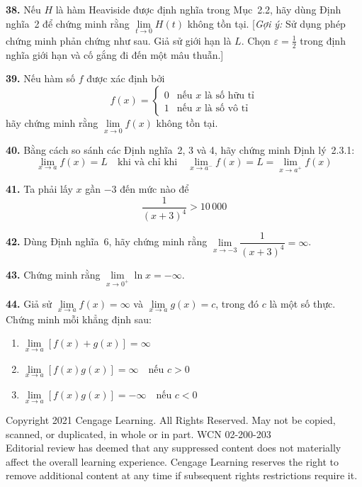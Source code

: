 \begin{minipage}[t]{0.48\textwidth}
\vspace{3pt}
\textbf{38.} Nếu $H$ là hàm Heaviside được định nghĩa trong Mục~2.2, hãy dùng Định nghĩa~2 để chứng minh rằng $\lim\limits_{t \to 0} H(t)$ không tồn tại. [\textit{Gợi ý:} Sử dụng phép chứng minh phản chứng như sau. Giả sử giới hạn là $L$. Chọn $\varepsilon = \frac{1}{2}$ trong định nghĩa giới hạn và cố gắng đi đến một mâu thuẫn.]

\vspace{3pt}
\textbf{39.} Nếu hàm số $f$ được xác định bởi
\[ f(x) = \begin{cases} 0 & \text{nếu } x \text{ là số hữu tỉ} \\ 1 & \text{nếu } x \text{ là số vô tỉ} \end{cases} \]
hãy chứng minh rằng $\lim\limits_{x \to 0} f(x)$ không tồn tại.

\vspace{2pt}
\textbf{40.} Bằng cách so sánh các Định nghĩa~2, 3 và 4, hãy chứng minh Định lý~2.3.1:
\[ \lim_{x \to a} f(x) = L \quad\text{khi và chỉ khi}\quad \lim_{x \to a^-} f(x) = L = \lim_{x \to a^+} f(x) \]

\textbf{41.} Ta phải lấy $x$ gần $-3$ đến mức nào để
\[ \frac{1}{(x + 3)^4} > 10\,000 \]

\textbf{42.} Dùng Định nghĩa~6, hãy chứng minh rằng $\lim\limits_{x \to -3} \dfrac{1}{(x + 3)^4} = \infty$.

\vspace{2pt}
\textbf{43.} Chứng minh rằng $\lim\limits_{x \to 0^+} \ln x = -\infty$.

\vspace{2pt}
\textbf{44.} Giả sử $\lim\limits_{x \to a} f(x) = \infty$ và $\lim\limits_{x \to a} g(x) = c$, trong đó $c$ là một số thực. Chứng minh mỗi khẳng định sau:
\begin{enumerate}[label=\textbf{(\alph*)}, leftmargin=1.5em, topsep=1pt, itemsep=0.5pt, parsep=0pt]
  \item $\lim\limits_{x \to a} [f(x) + g(x)] = \infty$
  \item $\lim\limits_{x \to a} [f(x)g(x)] = \infty \quad\text{nếu } c > 0$
  \item $\lim\limits_{x \to a} [f(x)g(x)] = -\infty \quad\text{nếu } c < 0$
\end{enumerate}

\end{minipage}

\vfill
\begin{center}
\fontsize{6.5}{8}\selectfont\color{stewartdarkgray}
Copyright 2021 Cengage Learning. All Rights Reserved. May not be copied, scanned, or duplicated, in whole or in part. WCN 02-200-203\\
Editorial review has deemed that any suppressed content does not materially affect the overall learning experience. Cengage Learning reserves the right to remove additional content at any time if subsequent rights restrictions require it.
\end{center}
